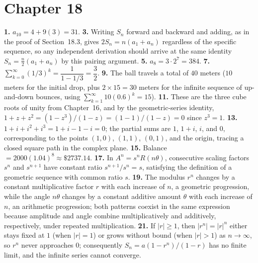 \section*{Chapter 18}
\textbf{1.} $a_{10} = 4+9(3) = 31$. \quad
\textbf{3.} Writing $S_n$ forward and backward and adding, as in the
proof of Section~18.3, gives $2S_n=n(a_1+a_n)$ regardless of the specific
sequence, so any independent derivation should arrive at the same
identity $S_n=\tfrac{n}{2}(a_1+a_n)$ by this pairing argument. \quad
\textbf{5.} $a_8 = 3\cdot2^7 = 384$. \quad
\textbf{7.} $\displaystyle\sum_{k=0}^\infty(1/3)^k = \dfrac{1}{1-1/3} =
\dfrac32$. \quad
\textbf{9.} The ball travels a total of $40$ meters ($10$ meters for the
initial drop, plus $2\times15=30$ meters for the infinite sequence of
up-and-down bounces, using $\sum_{k=1}^\infty 10(0.6)^k = 15$). \quad
\textbf{11.} These are the three cube roots of unity from
Chapter~16, and by the geometric-series identity, $1+z+z^2 =
(1-z^3)/(1-z) = (1-1)/(1-z) = 0$ since $z^3=1$. \quad
\textbf{13.} $1+i+i^2+i^3 = 1+i-1-i = 0$; the partial sums are $1$,
$1+i$, $i$, and $0$, corresponding to the points $(1,0)$, $(1,1)$,
$(0,1)$, and the origin, tracing a closed square path in the complex
plane. \quad
\textbf{15.} Balance $=2000(1.04)^8 \approx \$2737.14$. \quad
\textbf{17.} In $A^n=s^nR(n\theta)$, consecutive scaling factors
$s^{n}$ and $s^{n+1}$ have constant ratio $s^{n+1}/s^n=s$, satisfying
the definition of a geometric sequence with common ratio $s$. \quad
\textbf{19.} The modulus $r^n$ changes by a constant multiplicative
factor $r$ with each increase of $n$, a geometric progression, while the
angle $n\theta$ changes by a constant additive amount $\theta$ with each
increase of $n$, an arithmetic progression; both patterns coexist in the
same expression because amplitude and angle combine multiplicatively and
additively, respectively, under repeated multiplication. \quad
\textbf{21.} If $|r|\geq1$, then $|r^n|=|r|^n$ either stays fixed at $1$
(when $|r|=1$) or grows without bound (when $|r|>1$) as $n\to\infty$, so
$r^n$ never approaches $0$; consequently $S_n=a(1-r^n)/(1-r)$ has no
finite limit, and the infinite series cannot converge.

